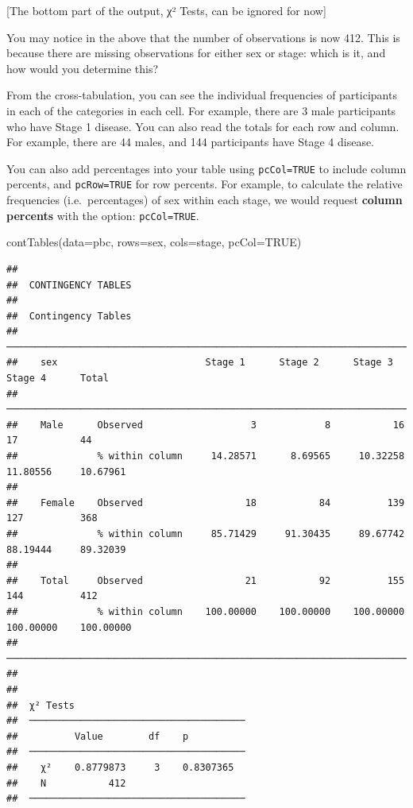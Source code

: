 \documentclass[
]{memoir}
\newenvironment{Shaded}{\begin{snugshade}}{\end{snugshade}}
\newcommand{\AttributeTok}[1]{\textcolor[rgb]{0.77,0.63,0.00}{#1}}
\newcommand{\ConstantTok}[1]{\textcolor[rgb]{0.00,0.00,0.00}{#1}}
\newcommand{\FunctionTok}[1]{\textcolor[rgb]{0.00,0.00,0.00}{#1}}
\newcommand{\NormalTok}[1]{#1}
\begin{document}
{[}The bottom part of the output, χ² Tests, can be ignored for now{]}

You may notice in the above that the number of observations is now 412. This is because there are missing observations for either sex or stage: which is it, and how would you determine this?

From the cross-tabulation, you can see the individual frequencies of participants in each of the categories in each cell. For example, there are 3 male participants who have Stage 1 disease. You can also read the totals for each row and column. For example, there are 44 males, and 144 participants have Stage 4 disease.

You can also add percentages into your table using \texttt{pcCol=TRUE} to include column percents, and \texttt{pcRow=TRUE} for row percents. For example, to calculate the relative frequencies (i.e.~percentages) of sex within each stage, we would request \textbf{column percents} with the option: \texttt{pcCol=TRUE}.

\begin{Shaded}
\begin{Highlighting}[]
\FunctionTok{contTables}\NormalTok{(}\AttributeTok{data=}\NormalTok{pbc, }\AttributeTok{rows=}\NormalTok{sex, }\AttributeTok{cols=}\NormalTok{stage, }\AttributeTok{pcCol=}\ConstantTok{TRUE}\NormalTok{)}
\end{Highlighting}
\end{Shaded}

\begin{verbatim}
## 
##  CONTINGENCY TABLES
## 
##  Contingency Tables                                                                             
##  ────────────────────────────────────────────────────────────────────────────────────────────── 
##    sex                          Stage 1      Stage 2      Stage 3      Stage 4      Total       
##  ────────────────────────────────────────────────────────────────────────────────────────────── 
##    Male      Observed                   3            8           16           17           44   
##              % within column     14.28571      8.69565     10.32258     11.80556     10.67961   
##                                                                                                 
##    Female    Observed                  18           84          139          127          368   
##              % within column     85.71429     91.30435     89.67742     88.19444     89.32039   
##                                                                                                 
##    Total     Observed                  21           92          155          144          412   
##              % within column    100.00000    100.00000    100.00000    100.00000    100.00000   
##  ────────────────────────────────────────────────────────────────────────────────────────────── 
## 
## 
##  χ² Tests                               
##  ────────────────────────────────────── 
##          Value        df    p           
##  ────────────────────────────────────── 
##    χ²    0.8779873     3    0.8307365   
##    N           412                      
##  ──────────────────────────────────────
\end{verbatim}
\end{document}
